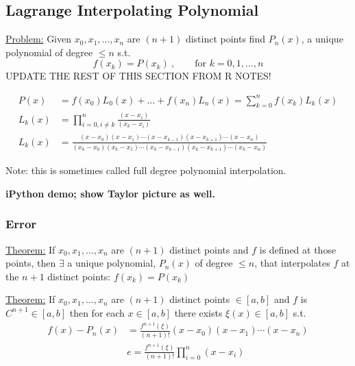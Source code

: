 \documentclass[12pt]{article}
\begin{document}
\subsection{Lagrange Interpolating Polynomial}
%
\underline{Problem:} Given $x_0, x_1,\dots, x_n$ are $(n+1)$ distinct points find $P_n(x)$, a unique polynomial of degree $\leq n$ s.t.\
\[f(x_k) = P(x_k)\:, \qquad \text{for }k= 0, 1, \dots, n\]
%
UPDATE THE REST OF THIS SECTION FROM R NOTES!

\begin{align}
P(x) &= f(x_0)L_0(x) + \dots + f(x_n)L_n(x) = \sum_{k=0}^{n}f(x_k)L_k(x) \\
%
L_k(x) &= \prod_{i=0, i \neq k}^n \frac{(x-x_i)}{(x_k-x_i)}\\
%
L_k(x) &= \frac{(x-x_0)(x-x_1)\cdots(x-x_{k-1})(x-x_{k+1})\cdots(x-x_n)}{(x_k-x_0)(x_k-x_1)\cdots(x_k-x_{k-1})(x_k-x_{k+1})\cdots(x_k-x_n)}
\end{align}

Note: this is sometimes called full degree polynomial interpolation.

\textbf{iPython demo; show Taylor picture as well.}

\subsubsection{Error}
\underline{Theorem:} If $x_0, x_1,\dots, x_n$ are $(n+1)$ distinct points and $f$ is defined at those points, then $\exists$ a unique polynomial, $P_{n}(x)$ of degree $ \leq n$, that interpolates $f$ at the $n + 1$ distinct points: $f(x_k) = P(x_k)$

\underline{Theorem:} If $x_0, x_1,\dots, x_n$ are $(n+1)$ distinct points $\in [a,b]$ and $f$ is $C^{n+1} \in [a,b]$ then for each $x\in [a,b]$ there exists $\xi(x) \in [a,b]$ s.t.
\begin{align}
f(x) - P_n(x)& = \frac{f^{n+1}(\xi)}{(n+1)!}(x-x_0)(x-x_1)\cdots(x-x_n) \\
&\boxed{e = \frac{f^{n+1}(\xi)}{(n+1)!}\prod_{i=0}^n (x-x_i)}
\end{align}
%
%
\end{document}
